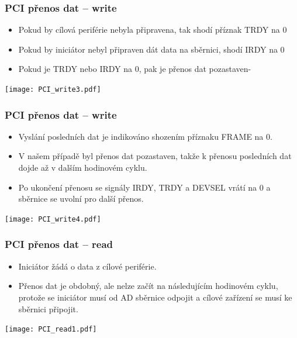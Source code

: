 \documentclass{beamer}
\begin{document}
\begin{frame}
\frametitle{PCI přenos dat -- write}

\begin{itemize}
\item Pokud by cílová periférie nebyla připravena, tak shodí příznak TRDY na 0
\item Pokud by iniciátor nebyl připraven dát data na sběrnici, shodí IRDY na 0 
\item Pokud je TRDY nebo IRDY na 0, pak je přenos dat pozastaven-
\end{itemize}

\texttt{[image: PCI\_write3.pdf]}

\end{frame}


\begin{frame}
\frametitle{PCI přenos dat -- write}

\begin{itemize}
\item Vyslání posledních dat je indikováno shozením příznaku FRAME na 0.
\item V našem případě byl přenos dat pozastaven, takže k přenosu posledních dat dojde až v dalším hodinovém cyklu.
\item Po ukončení přenosu se signály IRDY, TRDY a DEVSEL vrátí na 0 a sběrnice se uvolní pro další přenos.
\end{itemize}

\texttt{[image: PCI\_write4.pdf]}

\end{frame}


\begin{frame}
\frametitle{PCI přenos dat -- read}

\begin{itemize}
\item Iniciátor žádá o data z cílové periférie.
\item Přenos dat je obdobný, ale nelze začít na následujícím hodinovém cyklu, protože se iniciátor musí od AD sběrnice odpojit a cílové zařízení se musí ke sběrnici připojit.
\end{itemize}

\texttt{[image: PCI\_read1.pdf]}

\end{frame}
\end{document}
